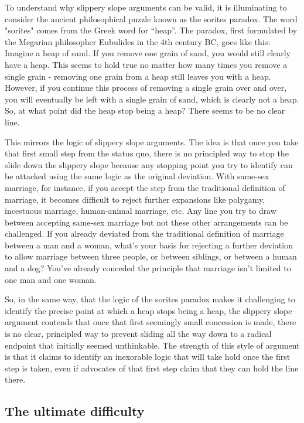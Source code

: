 \documentclass[man,floatsintext]{apa7}
\begin{document}
To understand why slippery slope arguments can be valid, it is illuminating to consider the ancient philosophical puzzle known as the sorites paradox. The word "sorites" comes from the Greek word for ``heap''. The paradox, first formulated by the Megarian philosopher Eubulides in the 4th century BC, goes like this: Imagine a heap of sand. If you remove one grain of sand, you would still clearly have a heap. This seems to hold true no matter how many times you remove a single grain - removing one grain from a heap still leaves you with a heap. However, if you continue this process of removing a single grain over and over, you will eventually be left with a single grain of sand, which is clearly not a heap. So, at what point did the heap stop being a heap? There seems to be no clear line.\autocite{hydeSoritesParadox2018}

This mirrors the logic of slippery slope arguments. The idea is that once you take that first small step from the status quo, there is no principled way to stop the slide down the slippery slope because any stopping point you try to identify can be attacked using the same logic as the original deviation.  With same-sex marriage, for instance, if you accept the step from the traditional definition of marriage, it becomes difficult to reject further expansions like polygamy, incestuous marriage, human-animal marriage, etc. Any line you try to draw between accepting same-sex marriage but not these other arrangements can be challenged. If you already deviated from the traditional definition of marriage between a man and a woman, what's your basis for rejecting a further deviation to allow marriage between three people, or between siblings, or between a human and a dog? You've already conceded the principle that marriage isn't limited to one man and one woman.

So, in the same way, that the logic of the sorites paradox makes it challenging to identify the precise point at which a heap stops being a heap, the slippery slope argument contends that once that first seemingly small concession is made, there is no clear, principled way to prevent sliding all the way down to a radical endpoint that initially seemed unthinkable. The strength of this style of argument is that it claims to identify an inexorable logic that will take hold once the first step is taken, even if advocates of that first step claim that they can hold the line there.

\subsection{The ultimate difficulty}
\end{document}
